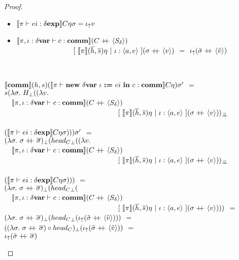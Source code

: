 \begin{proof}
\begin{itemize}
\begin{itemize}
\begin{itemize}
\item $\llbracket \pi \vdash ei : \delta \textbf{exp} \rrbracket C\eta\sigma = \iota_{\uparrow} v$
\item $\llbracket \pi,\iota:\delta \textbf{var} \vdash c : \textbf{comm} \rrbracket(C +\kern-1.3ex+\kern0.8ex \langle S_\delta \rangle)$\\
\indent \ \ \ \ \ \ \ \ \ \ \ \ \ \ \ \
$[ \ \semBrcks{\pi}(\hover,\sover)\eta \ | \ \iota:\lrangles{a,e} \ ]
(\sigma\concat \lrangles{v})$ $=$ $\iota_{\uparrow} (\tilde{\sigma} +\kern-1.3ex+\kern0.8ex \langle \tilde{v} \rangle)$
\end{itemize}

\

$\llbracket \textbf{comm} \rrbracket(h,s)(\llbracket \pi \vdash \textbf{new} \ \delta \textbf{var} \ \iota \ \textbf{:=} \ ei \ \textbf{in} \ c : \textbf{comm} \rrbracket C\eta)\sigma'$ $=$\\
$s (\lambda \sigma . \ H_{\bot} ((\lambda v .$ \\
\indent \ \ 
	$\llbracket \pi,\iota:\delta \textbf{var} \vdash c : \textbf{comm} \rrbracket(C +\kern-1.3ex+\kern0.8ex \langle S_\delta \rangle)$\\
\indent \ \ \ \ \ \ \ \ \ \ \ \ \ \ \ \ \ \ \ \ \ \ \ \ \ \ \ \ \ \ \ \
			$[ \ \semBrcks{\pi}(\hover,\sover)\eta \ | \ \iota:\lrangles{a,e} \ ]
			(\sigma\concat \lrangles{v}))_{\dbot}$\\
\indent \ \ \ \ \ \ \ \ \ \ \ \ \ \ \ \ \ \ \ \ \ \ \ \ \ \ \ \ \ \ \ \ \ \ \ \ \ \ \ \ \ \ \ \ \
 \ \ \ \ \ \ \ \ \ \ \ \ \ \ \ \ \ \ \ \ \ \ \ \ \ \ \
		$(\llbracket \pi \vdash ei : \delta \textbf{exp} \rrbracket C\eta\sigma)) ) \sigma'$ $=$\\
$(\lambda \sigma . \ \sigma +\kern-1.3ex+\kern0.8ex \overline{\sigma})_{\bot}({head_{C}}_{\bot} ((\lambda v .$ \\
\indent \ \ 
	$\llbracket \pi,\iota:\delta \textbf{var} \vdash c : \textbf{comm} \rrbracket(C +\kern-1.3ex+\kern0.8ex \langle S_\delta \rangle)$\\
\indent \ \ \ \ \ \ \ \ \ \ \ \ \ \ \ \ \ \ \ \ \ \ \ \ \ \ \ \ \ \ \ \
			$[ \ \semBrcks{\pi}(\hover,\sover)\eta \ | \ \iota:\lrangles{a,e} \ ]
			(\sigma\concat \lrangles{v}))_{\dbot}$\\
\indent \ \ \ \ \ \ \ \ \ \ \ \ \ \ \ \ \ \ \ \ \ \ \ \ \ \ \ \ \ \ \ \ \ \ \ \ \ \ \ \ \ \ \ \ \
 \ \ \ \ \ \ \ \ \ \ \ \ \ \ \ \ \ \ \ \ \ \ \ \ \ \ \
		$(\llbracket \pi \vdash ei : \delta \textbf{exp} \rrbracket C\eta\sigma)))$ $=$\\
$(\lambda \sigma . \ \sigma +\kern-1.3ex+\kern0.8ex \overline{\sigma})_{\bot}({head_{C}}_{\bot} ($ \\
\indent \ \ 
	$\llbracket \pi,\iota:\delta \textbf{var} \vdash c : \textbf{comm} \rrbracket(C +\kern-1.3ex+\kern0.8ex \langle S_\delta \rangle)$\\
\indent \ \ \ \ \ \ \ \ \ \ \ \ \ \ \ \ \ \ \ \ \ \ \ \ \ \ \ \ \ \ \ \
			$[ \ \semBrcks{\pi}(\hover,\sover)\eta \ | \ \iota:\lrangles{a,e} \ ]
			(\sigma\concat \lrangles{v})))$ $=$\\
$(\lambda \sigma . \ \sigma +\kern-1.3ex+\kern0.8ex \overline{\sigma})_{\bot}
({head_{C}}_{\bot} (\iota_{\uparrow} (\tilde{\sigma} +\kern-1.3ex+\kern0.8ex \langle \tilde{v} \rangle)))$ $=$\\
$((\lambda \sigma . \ \sigma +\kern-1.3ex+\kern0.8ex \overline{\sigma}) \circ
head_{C})_{\bot} (\iota_{\uparrow} (\tilde{\sigma} +\kern-1.3ex+\kern0.8ex \langle \tilde{v} \rangle))$ $=$\\
$\iota_{\uparrow} (\tilde{\sigma} +\kern-1.3ex+\kern0.8ex \overline{\sigma})$\\


\end{itemize}
\end{itemize}
\end{proof}
